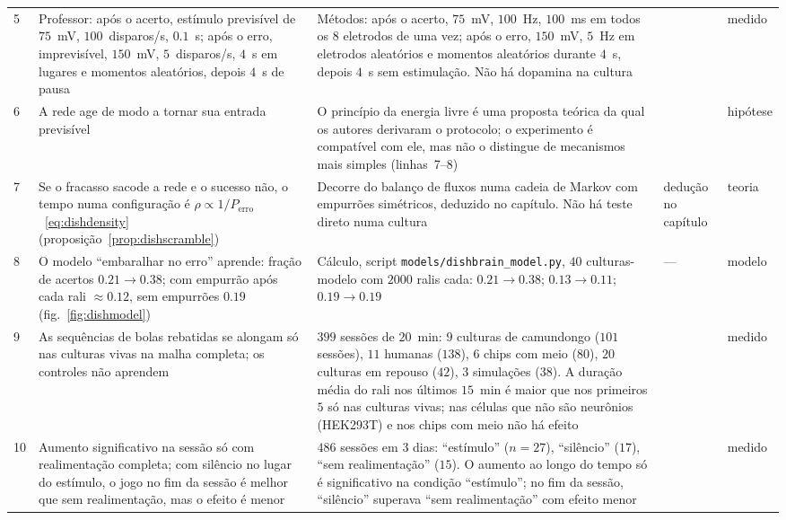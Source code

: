 {\begin{longtable}{>{\raggedright}p{0.5cm}>{\raggedright}p{4.0cm}>{\raggedright}p{5.6cm}>{\raggedright}p{2.3cm}>{\raggedright\arraybackslash}p{1.7cm}}
5 & Professor: após o acerto, estímulo previsível de $75$~mV, $100$~disparos/s, $0.1$~s; após o erro, imprevisível, $150$~mV, $5$~disparos/s, $4$~s em lugares e momentos aleatórios, depois $4$~s de pausa & Métodos: após o acerto, $75$~mV, $100$~Hz, $100$~ms em todos os $8$ eletrodos de uma vez; após o erro, $150$~mV, $5$~Hz em eletrodos aleatórios e momentos aleatórios durante $4$~s, depois $4$~s sem estimulação. Não há dopamina na cultura & \cite{Kagan2022} & medido \\
6 & A rede age de modo a tornar sua entrada previsível & O princípio da energia livre é uma proposta teórica da qual os autores derivaram o protocolo; o experimento é compatível com ele, mas não o distingue de mecanismos mais simples (linhas~7--8) & \cite{Friston2010,Kagan2022} & hipótese \\
7 & Se o fracasso sacode a rede e o sucesso não, o tempo numa configuração é $\rho\propto1/P_{\text{erro}}$~\eqref{eq:dishdensity} (proposição~\ref{prop:dishscramble}) & Decorre do balanço de fluxos numa cadeia de Markov com empurrões simétricos, deduzido no capítulo. Não há teste direto numa cultura & dedução no capítulo & teoria \\
8 & O modelo ``embaralhar no erro'' aprende: fração de acertos $0.21\to0.38$; com empurrão após cada rali $\approx0.12$, sem empurrões $0.19$ (fig.~\ref{fig:dishmodel}) & Cálculo, script \texttt{models/dishbrain\_model.py}, $40$ culturas-modelo com $2000$ ralis cada: $0.21\to0.38$; $0.13\to0.11$; $0.19\to0.19$ & --- & modelo \\
9 & As sequências de bolas rebatidas se alongam só nas culturas vivas na malha completa; os controles não aprendem & $399$ sessões de $20$~min: $9$ culturas de camundongo ($101$ sessões), $11$ humanas ($138$), $6$ chips com meio ($80$), $20$ culturas em repouso ($42$), $3$ simulações ($38$). A duração média do rali nos últimos $15$~min é maior que nos primeiros $5$ só nas culturas vivas; nas células que não são neurônios (HEK293T) e nos chips com meio não há efeito & \cite{Kagan2022} & medido \\
10 & Aumento significativo na sessão só com realimentação completa; com silêncio no lugar do estímulo, o jogo no fim da sessão é melhor que sem realimentação, mas o efeito é menor & $486$ sessões em $3$ dias: ``estímulo'' ($n=27$), ``silêncio'' ($17$), ``sem realimentação'' ($15$). O aumento ao longo do tempo só é significativo na condição ``estímulo''; no fim da sessão, ``silêncio'' superava ``sem realimentação'' com efeito menor & \cite{Kagan2022} & medido \\

\end{longtable}}
